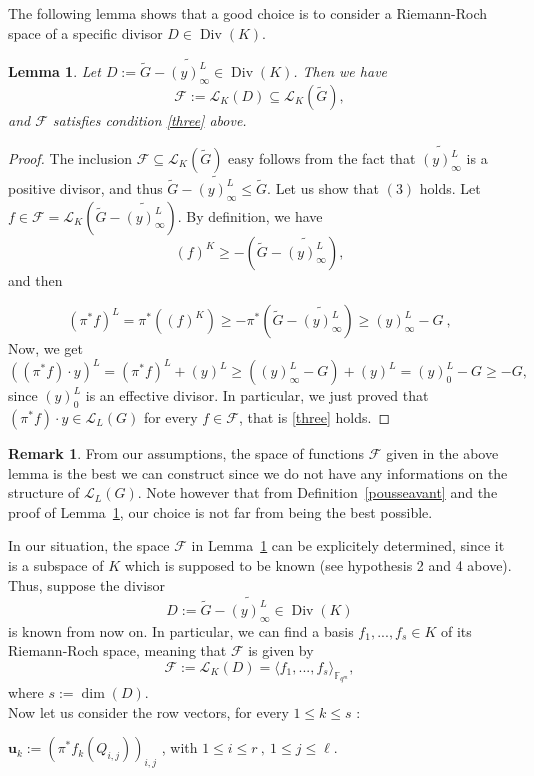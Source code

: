 \documentclass[10pt]{article}
\newtheorem{lem1}[thm]{Lemma}
\theoremstyle{definition}
\newtheorem{rq1}[thm]{Remark}
\theoremstyle{definition}
\theoremstyle{definition}
\newcommand{\s}{\vspace{0.3cm}}
\newcommand{\cd}{\cdot}
\newcommand{\fqm}{\mathbb{F}_{q^m}}
\newcommand{\su}{\subseteq}
\newcommand{\Div}{\operatorname{Div}}
\newcommand{\calL}{\mathcal{L}}
\begin{document}
\color{purple} The following lemma shows that a good choice is to consider a Riemann-Roch space of a specific divisor $D \in \Div(K)$.   

\s

\begin{lem1} \label{constructionD} Let $D := \widetilde{G}-\widetilde{(y)^L_{\infty}} \in \Div(K)$. Then we have
\[\mathcal{F} := \calL_K(D) \su \calL_K(\tilde{G}),\]
and $\mathcal{F}$ satisfies condition \eqref{three} above.
\end{lem1}
\color{black}

\s

\begin{proof}
The inclusion $\mathcal{F} \su \calL_K(\tilde{G})$ easy follows from the fact that $\widetilde{(y)^L_{\infty}}$ is a positive divisor, and thus $\tilde{G}-\widetilde{(y)^L_{\infty}} \leq \tilde{G}$. Let us show that $(3)$ holds. Let $f \in \mathcal{F} =  \calL_K\left(\tilde{G}-\widetilde{(y)^L_{\infty}}\right)$. By definition, we have
\[(f)^K \geq -\left(\tilde{G}-\widetilde{(y)^L_{\infty}}\right),\]
and then

\[(\pi^*f)^L = \pi^*((f)^K) \geq -\pi^*\left(\tilde{G}-\widetilde{(y)^L_{\infty}}\right) \geq (y)^L_{\infty} - G \ ,\]
Now, we get 
\[((\pi^*f) \cd y)^L = (\pi^*f)^L  + (y)^L \geq  ((y)^L_{\infty} - G)+(y)^L = (y)^L_0 - G \geq -G,\]
since $(y)^L_0$ is an effective divisor. In particular, we just proved that $(\pi^*f) \cd y \in \calL_L(G)$ for every $f \in \mathcal{F}$, that is \eqref{three} holds.
\end{proof}

\s

\color{purple}
\begin{rq1}  \label{remark5}
From our assumptions, the space of functions $\mathcal{F}$ given in the above lemma is the best we can construct since we do not have any informations on the structure of $\calL_L(G)$. Note however that from Definition~\ref{pousseavant} and the proof of Lemma~\ref{constructionD}, our choice is not far from being the best possible.  
\end{rq1}
\color{black}
\s

In our situation, the space $\mathcal{F}$ in Lemma~\ref{constructionD} can be explicitely determined, since it is a subspace of $K$ which is supposed to be known (see hypothesis 2 and 4 above). Thus, suppose the divisor 
\begin{equation} \label{four}
D := \tilde{G} - \widetilde{(y)^L_{\infty}} \in \Div(K)
\end{equation}
is known from now on. In particular, we can find a basis $f_1,...,f_s \in K$ of its Riemann-Roch space, meaning that $\mathcal{F}$ is given by
\[\mathcal{F} := \calL_K(D) = \langle f_1,...,f_s \rangle_{\fqm},\]
where $s := \dim(D)$. \\
Now let us consider the row vectors, for every $1 \leq k \leq s$ :
\begin{center}
$\mathbf{u}_{k}:= \left(\pi^*f_k(Q_{i,j})\right)_{i,j}$ , with $1 \leq i \leq r \ , \ 1 \leq j \leq \ell$.
\end{center}
\end{document}
